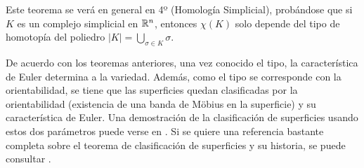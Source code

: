 \documentclass[GTS.tex]{subfiles}
\begin{document}
Este teorema se verá en general en 4º (Homología Simplicial), probándose que si $K$ es un complejo simplicial en $\mathbb{R}^n$, entonces $\chi(K)$ solo depende del tipo de homotopía del poliedro $|K|=\underset{\sigma\in K}{\bigcup}\sigma$.


\begin{nota} De acuerdo con los teoremas anteriores, una vez conocido el tipo, la característica de Euler determina a la variedad. Además, como el tipo se corresponde con la orientabilidad, se tiene que las superficies quedan clasificadas por la orientabilidad (existencia de una banda de Möbius en la superficie) y su característica de Euler. Una demostración de la clasificación de superficies usando estos dos parámetros puede verse en \cite{Zeeman}. Si se quiere una referencia bastante completa sobre el teorema de clasificación de superficies y su historia, se puede consultar \cite{Xu}.
\end{nota}
\end{document}
